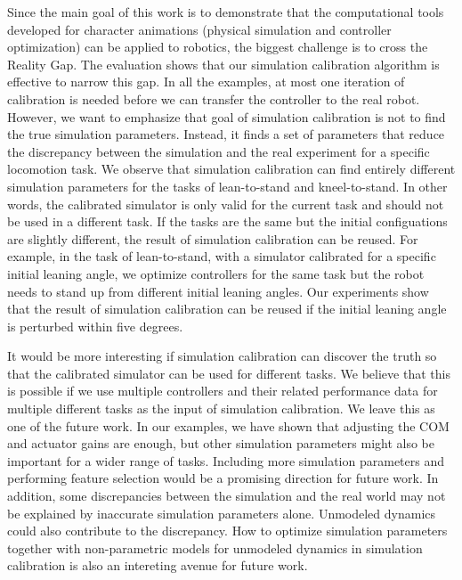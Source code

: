 Since the main goal of this work is to demonstrate that the computational tools developed for character animations (physical simulation and controller optimization) can be applied to robotics, the biggest challenge is to cross the Reality Gap. The evaluation shows that our simulation calibration algorithm is effective to narrow this gap. In all the examples, at most one iteration of calibration is needed before we can transfer the controller to the real robot. However, we want to emphasize that goal of simulation calibration is not to find the  true simulation parameters. Instead, it finds a set of parameters that reduce the discrepancy between the simulation and the real experiment for a specific locomotion task. We observe that simulation calibration can find entirely different simulation parameters for the tasks of lean-to-stand and kneel-to-stand. In other words, the calibrated simulator is only valid for the current task and should not be used in a different task. If the tasks are the same but the initial configuations are slightly different, the result of simulation calibration can be reused. For example, in the task of lean-to-stand, with a simulator calibrated for a specific initial leaning angle, we optimize controllers for the same task but the robot needs to stand up from different initial leaning angles. Our experiments show that the result of simulation calibration can be reused if the initial leaning angle is perturbed within five degrees. 

It would be more interesting if simulation calibration can discover the truth so that the calibrated simulator can be used for different tasks. We believe that this is possible if we use multiple controllers and their related performance data for multiple different tasks as the input of simulation calibration. We leave this as one of the future work. In our examples, we have shown that adjusting the COM and actuator gains are enough, but other simulation parameters might also be important for a wider range of tasks. Including more simulation parameters and performing feature selection would be a promising direction for future work. In addition, some discrepancies between the simulation and the real world may not be explained by inaccurate simulation parameters alone. Unmodeled dynamics could also contribute to the discrepancy. How to optimize simulation parameters together with non-parametric models for unmodeled dynamics in simulation calibration is also an intereting avenue for future work.


